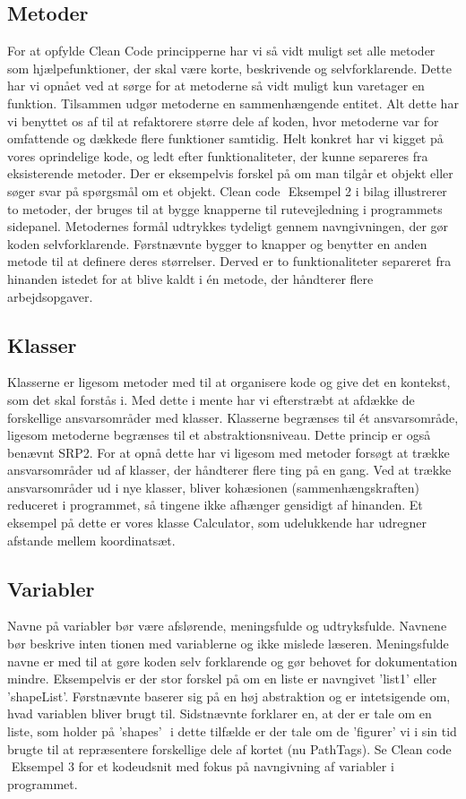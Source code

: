 \documentclass{article}
\begin{document}
\subsection{Metoder}
For at opfylde Clean Code principperne har vi så vidt muligt set alle metoder som hjælpefunktioner, der skal være korte, beskrivende og selvforklarende. Dette har vi opnået ved at sørge for at metoderne så vidt muligt kun varetager en funktion. Tilsammen udgør metoderne en sammenhængende entitet. Alt dette har vi benyttet os af til at refaktorere større dele af koden, hvor metoderne var for omfattende og dækkede flere funktioner samtidig. Helt konkret har vi kigget på vores oprindelige kode, og ledt efter funktionaliteter, der kunne separeres fra eksisterende metoder. Der er eksempelvis forskel på om man tilgår et objekt eller søger svar på spørgsmål om et objekt. Clean code ­ Eksempel 2 i bilag illustrerer to metoder, der bruges til at bygge knapperne til rutevejledning i programmets sidepanel. Metodernes formål udtrykkes tydeligt gennem navngivningen, der gør koden selvforklarende. Førstnævnte bygger to knapper og benytter en anden metode til at definere deres størrelser. Derved er to funktionaliteter separeret fra hinanden istedet for at blive kaldt i én metode, der håndterer flere arbejdsopgaver.

\subsection{Klasser}
Klasserne er ligesom metoder med til at organisere kode og give det en kontekst, som det skal forstås i. Med dette i mente har vi efterstræbt at afdække de forskellige ansvarsområder med klasser. Klasserne begrænses til ét ansvarsområde, ligesom metoderne begrænses til et abstraktionsniveau. Dette princip er også benævnt SRP2. For at opnå dette har vi ligesom med metoder forsøgt at trække ansvarsområder ud af klasser, der håndterer flere ting på en gang. Ved at trække ansvarsområder ud i nye klasser, bliver kohæsionen (sammenhængskraften) reduceret i programmet, så tingene ikke afhænger gensidigt af hinanden. Et eksempel på dette er vores klasse Calculator, som udelukkende har udregner afstande mellem koordinatsæt.

\subsection{Variabler}
Navne på variabler bør være afslørende, meningsfulde og udtryksfulde. Navnene bør beskrive inten­ tionen med variablerne og ikke mislede læseren. Meningsfulde navne er med til at gøre koden selv­ forklarende og gør behovet for dokumentation mindre. Eksempelvis er der stor forskel på om en liste er navngivet ’list1’ eller ’shapeList’. Førstnævnte baserer sig på en høj abstraktion og er intetsigende om, hvad variablen bliver brugt til. Sidstnævnte forklarer en, at der er tale om en liste, som holder på ’shapes’ ­ i dette tilfælde er der tale om de ’figurer’ vi i sin tid brugte til at repræsentere forskellige dele af kortet (nu PathTags). Se Clean code ­ Eksempel 3 for et kodeudsnit med fokus på navngivning af variabler i programmet.
\end{document}
